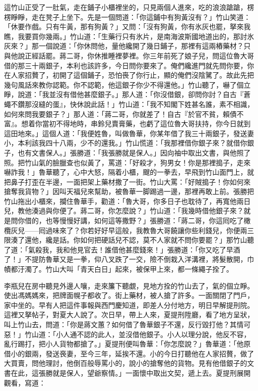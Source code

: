 這竹山正受了一肚氣，走在鋪子小櫃裡坐的，只見兩個人進來，吃的浪浪蹌蹌，楞楞睜睜，走在凳子上坐下。{}先是一個問道：「你這鋪中有狗黃沒有？」竹山笑道：「休要作戲。只有牛黃，那有狗黃？」又問：「沒有狗黃，你有氷灰也罷，拏來我瞧，我要買你幾兩。」竹山道：「生藥行只有氷片，是南海波斯國地道出的，那討氷灰來？」那一個說道：「你休問他，量他纔開了幾日鋪子，那裡有這兩樁藥材？只與他說正經話罷。蔣二哥，你休推睡裡夢裡。你三年前死了娘子兒，問這位魯大哥借的那三十兩銀子，本利也該許多，今日問你要來了。俺們纔進門就先問你要，你在人家招贅了，初開了這個鋪子，恐怕䘮了你行止，顯的俺們沒陰騭了。故此先把幾句風話來教你認範。你不認範，他這銀子你少不得還他。」竹山聽了，嚇了個立睜，說道：「我並沒有借他甚麼銀子。」那人道：「你沒借銀，卻問你討？自古『蒼蠅不鑽那沒縫的蛋』，快休說此話！」竹山道：「我不知閣下姓甚名誰，素不相識，如何來問我要銀子？」那人道：「蔣二哥，你就差了！自古『於官不貧，賴債不富』。想着你當初不得地時，串鈴兒賣膏藥，{}也虧了這位魯大哥扶持，你今日就到這田地來。」這個人道：「我便姓魯，叫做魯華，{}你某年借了我三十兩銀子，發送妻小，本利該我四十八兩，少不的還我。」竹山慌道：「我那裡借你銀子來？就借你銀子，也有文書保人。」張勝道：「我張勝就是保人。」因向袖中取出文書，與他照了照。把竹山氣的臉臘查也似黃了，罵道：「好殺才，狗男女！你是那裡搗子，走來嚇詐我！」魯華聽了，心中大怒，隔着小櫃，颼的一拳去，早飛到竹山面門上，就把鼻子打歪在半邊，一面把架上藥材撒了一街。竹山大罵：「好賊搗子！你如何來搶奪我貨物？」因叫天福兒來幫助，被魯華一脚踢過一邊，那裡再敢上前。張勝把竹山拖出小櫃來，攔住魯華手，勸道：「魯大哥，你多日子也耽待了，再寬他兩日兒，教他湊過與你便了。蔣二哥，你怎麼說？」竹山道：「我幾時借他銀子來？就是問你借的，也等慢慢好講，如何這等撒野？」張勝道：「蔣二哥，你這囘吃了橄欖灰兒——囘過味來了？你若好好早這般，我教魯大哥饒讓你些利錢兒，你便兩三限湊了還他，纔是話。你如何把硬話兒不認，莫不人家就不問你要罷？」那竹山聽了道：「氣殺我，我和他見官去！誰借他甚麼錢來！」張勝道：「你又吃了早酒了！」不提防魯華又是一拳，仰八叉跌了一交，險不倒栽入洋溝裡，將髮散開，巾幘都汙濁了。竹山大叫「青天白日」起來，被保甲上來，都一條繩子拴了。

李瓶兒在房中聽見外邊人嚷，走來簾下聽覷，見地方拴的竹山去了，氣的個立睜。使出馮媽媽來，把牌面幌子都收了。街上藥材，被人搶了許多。一面關閉了門戶，家中坐的。早有人把這件事報與西門慶知道，即差人分付地方，明日早解提刑院。這裡又拏帖子，對夏大人說了。次日早，帶上人來，夏提刑陞廳，看了地方呈狀，叫上竹山去，問道：「你是蔣文蕙？如何借了魯華銀子不還，反行毀打他？其情可惡！」竹山道：「小人通不認的此人，並沒借他銀子。小人以理分說，他反不容，亂行踢打，把小人貨物都搶了。」夏提刑便叫魯華：「你怎麼說？」魯華道：「他原借小的銀兩，發送䘮妻，至今三年，延挨不還。小的今日打聽他在人家招贅，做了大買賣，問他理討，他倒百般辱罵小的，說小的搶奪他的貨物。見有他借銀子的文書在此，這張勝就是保人，望爺察情。」一面懷中取出文契，遞上去。夏提刑展開觀看，寫道：

